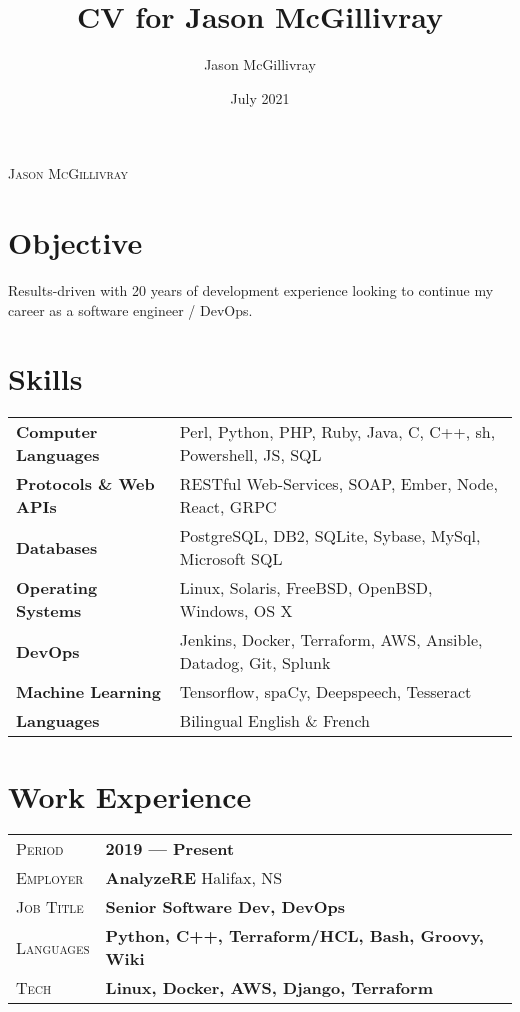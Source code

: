 \documentclass[a4paper, oneside, final]{scrartcl}
\title{CV for Jason McGillivray}
\author{Jason McGillivray}
\date {July 2021}
\newcommand{\gray}{\rowcolor[gray]{.90}}
\begin{document}
\begin{center} %

{\fontsize{20}{20}\selectfont\scshape Jason McGillivray}

\vspace{.2cm} %

\section{Objective}
Results-driven with 20 years of development experience looking to continue my career as a software engineer / DevOps.

\section{Skills}

\begin{tabular}{ @{} >{\bfseries}l @{\hspace{6ex}} l }
Computer Languages & Perl, Python, PHP, Ruby, Java, C, C++, sh, Powershell, JS, SQL \\
Protocols \& Web APIs & RESTful Web-Services, SOAP, Ember, Node, React, GRPC\\
Databases & PostgreSQL, DB2, SQLite, Sybase, MySql, Microsoft SQL \\
Operating Systems & Linux, Solaris, FreeBSD, OpenBSD, Windows, OS X\\
DevOps & Jenkins, Docker, Terraform, AWS, Ansible, Datadog, Git, Splunk\\
Machine Learning& Tensorflow, spaCy, Deepspeech, Tesseract\\
Languages & Bilingual English \& French\\
\end{tabular}



\section{Work Experience}


\begin{tabularx}{0.97\linewidth}{>{\raggedleft\scshape}p{2cm}X}
\gray Period & \textbf{2019 --- Present}\\
\gray Employer & \textbf{AnalyzeRE} \hfill Halifax, NS\\
\gray Job Title & \textbf{Senior Software Dev, DevOps}\\
\gray Languages & \textbf{Python, C++, Terraform/HCL, Bash, Groovy, Wiki}\\
\gray Tech & \textbf{Linux, Docker, AWS, Django, Terraform}\\


\end{tabularx}
\end{center}
\end{document}

